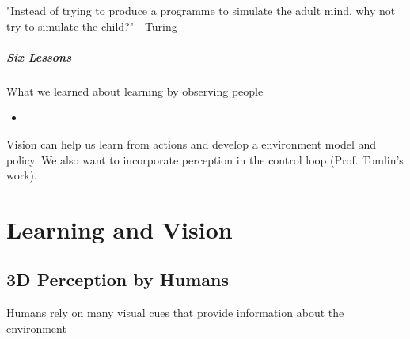 \documentclass{report}
\begin{document}
"Instead of trying to produce a programme to simulate the adult mind, why not try to simulate the child?" - Turing

\paragraph{Six Lessons} What we learned about learning by observing people
\begin{itemize}
    \item 
\end{itemize}

Vision can help us learn from actions and develop a environment model and policy. We also want to incorporate perception in the control loop (Prof. Tomlin's work).

\chapter{Learning and Vision}


\section{3D Perception by Humans}

Humans rely on many visual cues that provide information about the environment
\end{document}
